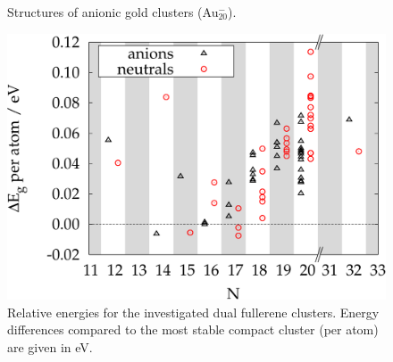 \begin{figure}[p]
\begin{center}
	\caption{Structures of anionic gold clusters (Au$_{20}^-$).}
	\label{fig:Au20-}
\end{center}
\end{figure} 

\begin{figure}[htbp]
\begin{center}
\includegraphics[width=.8\textwidth]{golddual/energies.pdf}
\caption{Relative energies for the investigated dual fullerene clusters.
Energy differences compared to the most stable compact cluster (per atom) are given in eV.}
\label{fig:AunMinus2}
\end{center}
\end{figure}

